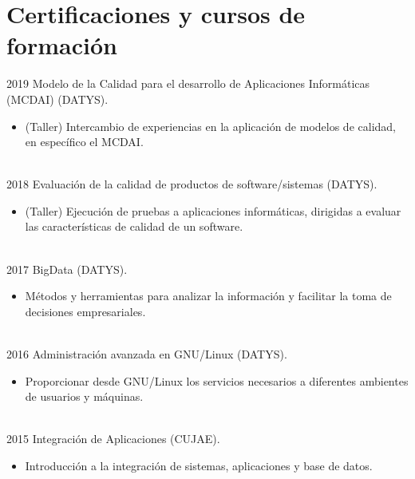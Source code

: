 \documentclass[letterpaper]{twentysecondcv} %
\begin{document}
\section{Certificaciones y cursos de formación}

\begin{twenty} %
\twentyitem
    	{2019}
		{}
        {Modelo de la Calidad para el desarrollo de Aplicaciones Informáticas (MCDAI) (DATYS).}
        {}
        {}
        {
        {\begin{itemize}
        \item (Taller) Intercambio de experiencias en la aplicación de modelos de calidad, en específico el MCDAI.
		\end{itemize}}
        }
        \\
\twentyitem
    	{2018}
		{}
        {Evaluación de la calidad de productos de software/sistemas (DATYS).}
        {}
        {}
        {
        {\begin{itemize}
        \item (Taller) Ejecución de pruebas a aplicaciones informáticas, dirigidas a evaluar las características de calidad de un software.
		\end{itemize}}
        }
        \\
\twentyitem
    	{2017}
		{}
        {BigData (DATYS).}
        {}
        {}
         {
        {\begin{itemize}
        \item Métodos y herramientas para analizar la información y facilitar la toma de decisiones empresariales.
		\end{itemize}}
        }
        \\
\twentyitem
    	{2016}
		{}
        {Administración avanzada en GNU/Linux (DATYS).}
        {}
        {}
        {
        {\begin{itemize}
        \item Proporcionar desde GNU/Linux los servicios necesarios a diferentes ambientes de usuarios y máquinas.
		\end{itemize}}
        }
        \\
\twentyitem
    	{2015}
		{}
        {Integración de Aplicaciones (CUJAE).}
        {}
        {}
        {
        {\begin{itemize}
        \item Introducción a la integración de sistemas, aplicaciones y base de datos.
		\end{itemize}}
        }
        \\

\end{twenty}
\end{document}
